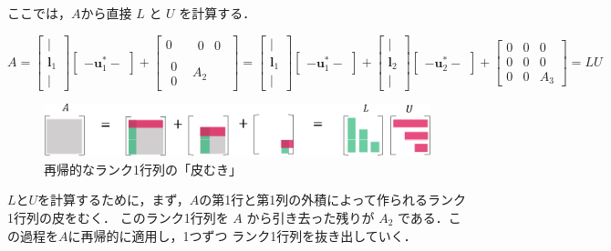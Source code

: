 \documentclass[letterpaper]{article}
\begin{document}
ここでは，$A$から直接 $L$ と $U$ を計算する．

\begin{equation*}
  A = 
      \begin{bmatrix}
        |\\
        \bm{l}_1\\
        |
      \end{bmatrix}
      \begin{bmatrix}
        -  \bm{u}^*_1  -
      \end{bmatrix}
  +  \begin{bmatrix}
      0 & \begin{matrix} 0 & 0 \end{matrix}\\
      \begin{matrix} 0 \\ 0 \end{matrix} & A_2
    \end{bmatrix}
  = 
  \begin{bmatrix}
    |\\
    \bm{l}_1\\
    |
  \end{bmatrix}
  \begin{bmatrix}
    - \bm{u}^*_1 -
  \end{bmatrix}
  +
  \begin{bmatrix}
    |\\
    \bm{l}_2\\
    |
  \end{bmatrix}
  \begin{bmatrix}
    - \bm{u}^*_2  -
  \end{bmatrix}
  +  \begin{bmatrix}
  0 & 0 & 0\\
  0 & 0 & 0 \\
  0 & 0 & A_3
  \end{bmatrix} = LU
\end{equation*}
 

\begin{figure}[H]
  \includegraphics[keepaspectratio, width=\linewidth]{LU1.eps}
\caption{再帰的なランク1行列の「皮むき」}
\end{figure}

$L$と$U$を計算するために，まず，$A$の第1行と第1列の外積によって作られるランク1行列の皮をむく．
このランク1行列を $A$ から引き去った残りが $A_2$ である．この過程を$A$に再帰的に適用し，1つずつ
ランク1行列を抜き出していく．
\end{document}
